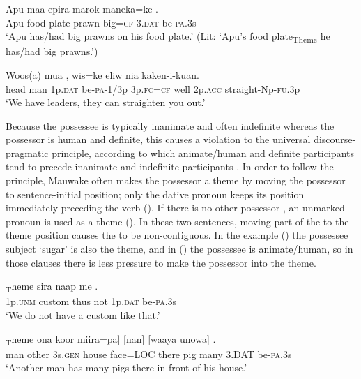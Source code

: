 \ea%
\label{ex:x1065}
\gll Apu  maa  epira  marok  maneka=ke  . \\
     Apu  food  plate  prawn  big=\textsc{cf}  3.\textsc{dat}  be-\textsc{pa}.3s \\
\glt `Apu has/had big prawns on his food plate.' (Lit: `Apu's food plate\textsubscript{Theme} he has/had big prawns.')
\z

\ea%
\label{ex:x1323}
\gll Woos(a)  mua  ,  wis=ke  eliw  nia kaken-i-kuan. \\
     head  man  1p.\textsc{dat}  be-\textsc{pa}-1/3p  3p.\textsc{fc}=\textsc{cf}  well  2p.\textsc{acc} straight-Np-\textsc{fu}.3p \\
\glt `We have leaders, they can straighten you out.'
\z

Because the possessee is typically inanimate and often indefinite whereas the possessor is human and definite, this causes a violation to the universal discourse-pragmatic principle, according to which animate/human and definite participants tend to precede inanimate and indefinite participants \citep[135]{Heine1997}. In order to follow the principle, Mauwake often makes the possessor a theme by moving the possessor  to sentence-initial position; only the dative pronoun keeps its position immediately preceding the verb (). If there is no other possessor , an unmarked pronoun is used as a theme (). In these two sentences, moving part of the  to the theme position causes the  to be non-contiguous. In the example () the possessee subject  `sugar' is also the theme, and in () the possessee is animate/human, so in those clauses there is less pressure to make the possessor into the theme.

\ea%
\label{ex:x973}
\gll [\textstyleEmphasizedVernacularWords{I}]\textsubscript{T}heme  sira  naap  me   . \\
     1p.\textsc{unm}  custom  thus  not  1p.\textsc{dat}  be-\textsc{pa}.3s \\
\glt `We do not have a custom like that.'
\z

\ea%
\label{ex:x972}
\textsubscript{T}heme  ona  koor  miira=pa]  [nan]  [waaya unowa]   . \\
     man  other  3s.\textsc{gen}  house  face=LOC  there  pig many  3.DAT  be-\textsc{pa}.3s \\
\glt `Another man has many pigs there in front of his house.'
\z


